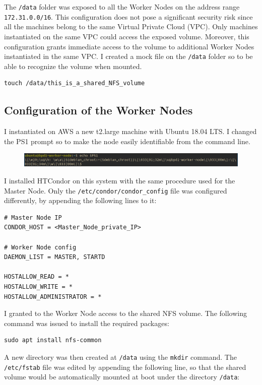 \documentclass{article}
\begin{document}
The \texttt{/data} folder was exposed to all the Worker Nodes on the address range \texttt{172.31.0.0/16}.
This configuration does not pose a significant security risk since all the machines belong to the same Virtual Private Cloud (VPC). Only machines instantiated on the same VPC could access the exposed volume.
Moreover, this configuration grants immediate access to the volume to additional Worker Nodes instantiated in the same VPC.
I created a mock file on the \texttt{/data} folder so to be able to recognize the volume when mounted.

\begin{lstlisting}
touch /data/this_is_a_shared_NFS_volume
\end{lstlisting}

\subsection{Configuration of the Worker Nodes}
I instantiated on AWS a new t2.large machine with Ubuntu 18.04 LTS.
I changed the PS1 prompt so to make the node easily identifiable from the command line.

\begin{figure}[!h]
    \center
    \includegraphics[width=\textwidth]{./images/worker-ps1.png}
\end{figure}

I installed HTCondor on this system with the same procedure used for the Master Node.
Only the \texttt{/etc/condor/condor\_config} file was configured differently, by appending the following lines to it:

\begin{lstlisting}
# Master Node IP
CONDOR_HOST = <Master_Node_private_IP>

# Worker Node config
DAEMON_LIST = MASTER, STARTD

HOSTALLOW_READ = *
HOSTALLOW_WRITE = *
HOSTALLOW_ADMINISTRATOR = *
\end{lstlisting}

I granted to the Worker Node access to the shared NFS volume.
The following command was issued to install the required packages:

\begin{lstlisting}
sudo apt install nfs-common
\end{lstlisting}

A new directory was then created at \texttt{/data} using the \texttt{mkdir} command.
The \texttt{/etc/fstab} file was edited by appending the following line, so that the shared volume would be automatically mounted at boot under the directory \texttt{/data}:
\end{document}
